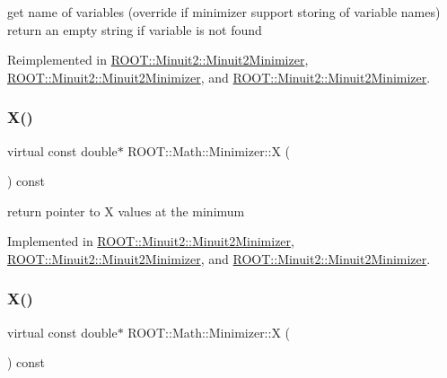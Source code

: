 get name of variables (override if minimizer support storing of variable names) return an empty string if variable is not found 

Reimplemented in \mbox{\hyperlink{classROOT_1_1Minuit2_1_1Minuit2Minimizer_a8f5a6dc65fdfeb0351039d80f7c94968}{R\+O\+O\+T\+::\+Minuit2\+::\+Minuit2\+Minimizer}}, \mbox{\hyperlink{classROOT_1_1Minuit2_1_1Minuit2Minimizer_a8f5a6dc65fdfeb0351039d80f7c94968}{R\+O\+O\+T\+::\+Minuit2\+::\+Minuit2\+Minimizer}}, and \mbox{\hyperlink{classROOT_1_1Minuit2_1_1Minuit2Minimizer_a8f5a6dc65fdfeb0351039d80f7c94968}{R\+O\+O\+T\+::\+Minuit2\+::\+Minuit2\+Minimizer}}.

\mbox{\label{classROOT_1_1Math_1_1Minimizer_a35c7c2caf54e548f892d84795209edad}} 
\subsubsection{\texorpdfstring{X()}{X()}\hspace{0.1cm}{\footnotesize\ttfamily [1/3]}}
{\footnotesize\ttfamily virtual const double$\ast$ R\+O\+O\+T\+::\+Math\+::\+Minimizer\+::X (\begin{DoxyParamCaption}{ }\end{DoxyParamCaption}) const\hspace{0.3cm}{\ttfamily [pure virtual]}}



return pointer to X values at the minimum 



Implemented in \mbox{\hyperlink{classROOT_1_1Minuit2_1_1Minuit2Minimizer_ac9372eb08937cf14acb8862ba3166c26}{R\+O\+O\+T\+::\+Minuit2\+::\+Minuit2\+Minimizer}}, \mbox{\hyperlink{classROOT_1_1Minuit2_1_1Minuit2Minimizer_ac9372eb08937cf14acb8862ba3166c26}{R\+O\+O\+T\+::\+Minuit2\+::\+Minuit2\+Minimizer}}, and \mbox{\hyperlink{classROOT_1_1Minuit2_1_1Minuit2Minimizer_ac9372eb08937cf14acb8862ba3166c26}{R\+O\+O\+T\+::\+Minuit2\+::\+Minuit2\+Minimizer}}.

\mbox{\label{classROOT_1_1Math_1_1Minimizer_a35c7c2caf54e548f892d84795209edad}} 
\subsubsection{\texorpdfstring{X()}{X()}\hspace{0.1cm}{\footnotesize\ttfamily [2/3]}}
{\footnotesize\ttfamily virtual const double$\ast$ R\+O\+O\+T\+::\+Math\+::\+Minimizer\+::X (\begin{DoxyParamCaption}{ }\end{DoxyParamCaption}) const\hspace{0.3cm}{\ttfamily [pure virtual]}}



